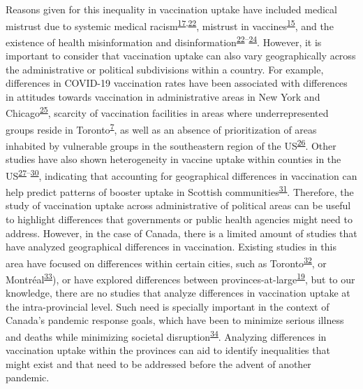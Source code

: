 \documentclass[
]{article}
\begin{document}
Reasons given for this inequality in vaccination uptake have included
medical mistrust due to systemic medical
racism\textsuperscript{\protect\hyperlink{ref-stoler2021}{17},\protect\hyperlink{ref-mosby2021}{22}},
mistrust in
vaccines\textsuperscript{\protect\hyperlink{ref-willis2021}{15}}, and
the existence of health misinformation and
disinformation\textsuperscript{\protect\hyperlink{ref-mosby2021}{22}--\protect\hyperlink{ref-freeman2020}{24}}.
However, it is important to consider that vaccination uptake can also
vary geographically across the administrative or political subdivisions
within a country. For example, differences in COVID-19 vaccination rates
have been associated with differences in attitudes towards vaccination
in administrative areas in New York and
Chicago\textsuperscript{\protect\hyperlink{ref-malik2020}{25}}, scarcity
of vaccination facilities in areas where underrepresented groups reside
in Toronto\textsuperscript{\protect\hyperlink{ref-bogoch2022}{7}}, as
well as an absence of prioritization of areas inhabited by vulnerable
groups in the southeastern region of the
US\textsuperscript{\protect\hyperlink{ref-nguyen2021}{26}}. Other
studies have also shown heterogeneity in vaccine uptake within counties
in the
US\textsuperscript{\protect\hyperlink{ref-mollalo2021}{27}--\protect\hyperlink{ref-bhuiyan2022}{30}},
indicating that accounting for geographical differences in vaccination
can help predict patterns of booster uptake in Scottish
communities\textsuperscript{\protect\hyperlink{ref-wood2022}{31}}.
Therefore, the study of vaccination uptake across administrative of
political areas can be useful to highlight differences that governments
or public health agencies might need to address. However, in the case of
Canada, there is a limited amount of studies that have analyzed
geographical differences in vaccination. Existing studies in this area
have focused on differences within certain cities, such as
Toronto\textsuperscript{\protect\hyperlink{ref-choi2021}{32}}, or
Montréal\textsuperscript{\protect\hyperlink{ref-mckinnon2021}{33}}), or
have explored differences between
provinces-at-large\textsuperscript{\protect\hyperlink{ref-guay2022}{19}},
but to our knowledge, there are no studies that analyze differences in
vaccination uptake at the intra-provincial level. Such need is specially
important in the context of Canada's pandemic response goals, which have
been to minimize serious illness and deaths while minimizing societal
disruption\textsuperscript{\protect\hyperlink{ref-naci2023}{34}}.
Analyzing differences in vaccination uptake within the provinces can aid
to identify inequalities that might exist and that need to be addressed
before the advent of another pandemic.
\end{document}
